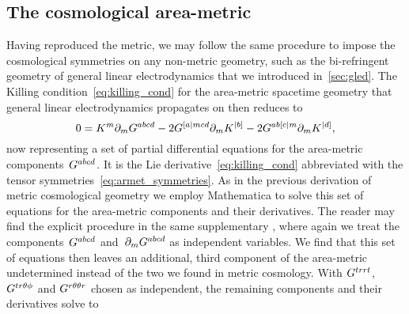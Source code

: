 \subsection{The cosmological area-metric}\label{sec:cosmo_armet}

Having reproduced the \FLRW{} metric, we may follow the same procedure to impose the cosmological symmetries on any non-metric geometry, such as the bi-refringent geometry of general linear electrodynamics that we introduced in~\autoref{sec:gled}. The Killing condition~\eqref{eq:killing_cond} for the area-metric spacetime geometry that general linear electrodynamics propagates on then reduces to
\begin{equation}\label{eq:armet_killing_cond}
0=K^m\partial_mG^{abcd}-2G^{[ a| mcd}\partial_mK^{| b]}-2G^{ab[ c| m}\partial_mK^{| d]}
\mathpunct{,}
\end{equation}
now representing a set of partial differential equations for the area-metric components~$G^{abcd}$. It is the Lie derivative~\eqref{eq:killing_cond} abbreviated with the tensor symmetries~\eqref{eq:armet_symmetries}. As in the previous derivation of metric cosmological geometry we employ Mathematica to solve this set of equations for the area-metric components and their derivatives. The reader may find the explicit procedure in the same supplementary , where again we treat the components~$G^{abcd}$ and~$\partial_mG^{abcd}$ as independent variables. We find that this set of equations then leaves an additional, third component of the area-metric undetermined instead of the two we found in metric cosmology. With $G^{trr t}$, $G^{tr\theta\phi}$ and $G^{r\theta\theta r}$ chosen as independent, the remaining components and their derivatives solve to
